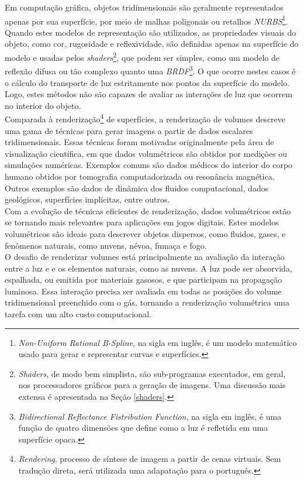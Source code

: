 Em computação gráfica, objetos tridimensionais são geralmente representados apenas por sua superfície, por meio de malhas poligonais ou retalhos \emph{NURBS}\footnote{\emph{Non-Uniform Rational B-Spline}, na sigla em inglês, é um modelo matemático usado para gerar e representar curvas e superfícies.}. Quando estes modelos de representação são utilizados, as propriedades visuais do objeto, como cor, rugosidade e reflexividade, são definidas apenas na superfície do modelo e usadas pelos \emph{shaders}\footnote{\emph{Shaders}, de modo bem simplista, são sub-programas executados, em geral, nos processadores gráficos para a geração de imagens. Uma discussão mais extensa é apresentada na Seção \ref{shaders}.}, que podem ser simples, como um modelo de reflexão difusa ou tão complexo quanto uma \emph{BRDF}\footnote{\emph{Bidirectional Reflectance Fistribution Function}, na sigla em inglês, é uma função de quatro dimensões que define como a luz é refletida em uma superfície opaca.}. O que ocorre nestes casos é o cálculo do transporte de luz estritamente nos pontos da superfície do modelo. Logo, estes métodos não são capazes de avaliar as interações de luz que ocorrem no interior do objeto. \\


Comparada à renderização\footnote{\emph{Rendering}, processo de síntese de imagem a partir de cenas virtuais. Sem tradução direta, será utilizada uma adapatação para o português. } de superfícies, a renderização de volumes descreve uma gama de técnicas para gerar imagens a partir de dados escalares tridimensionais. Essas técnicas foram motivadas originalmente pela área de visualização científica, em que dados volumétricos são obtidos por medições ou simulações numéricas. Exemplos comuns são dados médicos do interior do corpo humano obtidos por tomografia computadorizada ou resonância magnética. Outros exemplos são dados de dinâmica dos fluidos computacional, dados geológicos, superfícies implícitas, entre outros. \\


Com a evolução de técnicas eficientes de renderização, dados volumétricos estão se tornando mais relevantes para aplicações em jogos digitais. Estes modelos volumétricos são ideais para descrever objetos dispersos, como fluidos, gases, e fenômenos naturais, como nuvens, névoa, fumaça e fogo. \\

O desafio de renderizar volumes está principalmente na avaliação da interação entre a luz e e os elementos naturais, como as nuvens. A luz pode ser absorvida, espalhada, ou emitida por materiais gasosos, e que participam na propagação luminosa. Essa interação precisa ser avaliada em todas as posições do volume tridimensional preenchido com o gás, tornando a renderização volumétrica uma tarefa com um alto custo computacional. 

